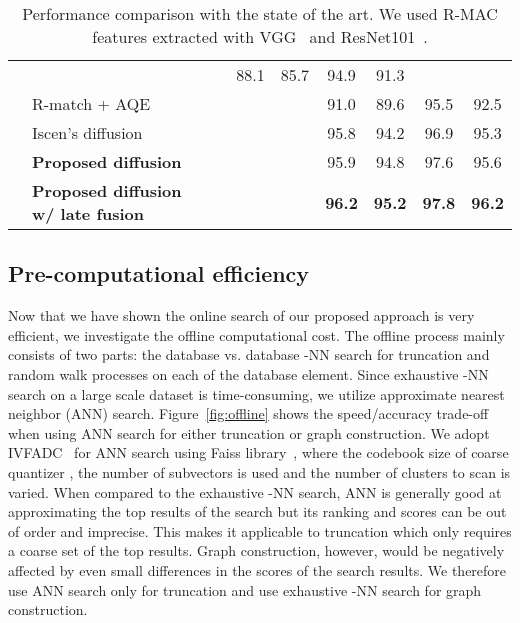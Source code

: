 \documentclass[letterpaper]{article} \usepackage{aaai19}  \usepackage{times}  \usepackage{helvet}  \usepackage{courier}  \usepackage{url}  \usepackage{graphicx}  \frenchspacing  \setlength{\pdfpagewidth}{8.5in}  \setlength{\pdfpageheight}{11in}
\newcommand{\cmark}{\ding{51}}
\begin{document}
\begin{table*}[t]
\begin{center}
\begin{tabular}{@{}l l c c c c c c c@{}}
                                                      &        & \cmark & 88.1 & 85.7 & 94.9 & 91.3 \\
    & R-match + AQE~\cite{chum2007total}            & &        & \cmark & 91.0 & 89.6 & 95.5 & 92.5 \\
    & Iscen's diffusion~\cite{iscen2017efficient}    & & \cmark & \cmark & 95.8 & 94.2 & 96.9 & 95.3\\
    & \textbf{Proposed diffusion}                   & &        & \cmark & 95.9 & 94.8 & 97.6 & 95.6 \\
    & \textbf{Proposed diffusion w/ late fusion}         & & \cmark & \cmark & \textbf{96.2} & \textbf{95.2} & \textbf{97.8} & \textbf{96.2} \\
\bottomrule
\end{tabular}
\end{center}
\caption{Performance comparison with the state of the art. We used R-MAC features extracted with VGG~\cite{radenovic2016cnn} and ResNet101~\cite{gordo2016deep}.}
\label{tab:results}
\vspace{-3mm}
\end{table*}

\subsection{Pre-computational efficiency}

Now that we have shown the online search of our proposed approach is very efficient, we investigate the offline computational cost.
The offline process mainly consists of two parts: the database vs. database -NN search for truncation and random walk processes on each of the database element.
Since exhaustive -NN search on a large scale dataset is time-consuming, we utilize approximate nearest neighbor (ANN) search.
Figure~\ref{fig:offline} shows the speed/accuracy trade-off when using ANN search for either truncation or graph construction.
We adopt IVFADC~\cite{jegou2011product} for ANN search using Faiss library~\cite{johnson2017billion}, where the codebook size of coarse quantizer , the number of subvectors  is used and the number of clusters to scan is varied.
When compared to the exhaustive -NN search, ANN is generally good at approximating the top results of the search but its ranking and scores can be out of order and imprecise.
This makes it applicable to truncation which only requires a coarse set of the top results.
Graph construction, however, would be negatively affected by even small differences in the scores of the search results.
We therefore use ANN search only for truncation and use exhaustive -NN search for graph construction.
\end{document}
